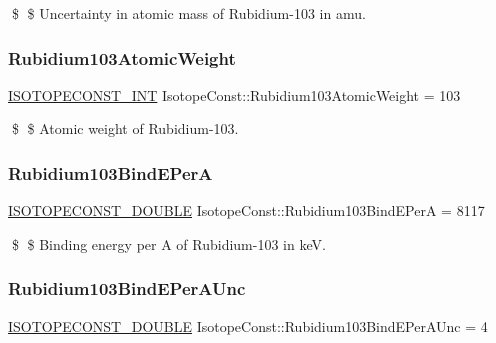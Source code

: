 \$ \$ Uncertainty in atomic mass of Rubidium-\/103 in amu. \mbox{\label{group___isotope_const-_rubidium-_rb103_ga675e2b14381f8e7da79d22f6431dfa25}} 
\subsubsection{\texorpdfstring{Rubidium103\+Atomic\+Weight}{Rubidium103AtomicWeight}}
{\footnotesize\ttfamily \mbox{\hyperlink{group___isotope_const-_macros_ga5f18360b3e99483a35c32d789e62621c}{I\+S\+O\+T\+O\+P\+E\+C\+O\+N\+S\+T\+\_\+\+I\+NT}} Isotope\+Const\+::\+Rubidium103\+Atomic\+Weight = 103}

\$ \$ Atomic weight of Rubidium-\/103. \mbox{\label{group___isotope_const-_rubidium-_rb103_ga9eebf343247ae664f3013ea9709173ca}} 
\subsubsection{\texorpdfstring{Rubidium103\+Bind\+E\+PerA}{Rubidium103BindEPerA}}
{\footnotesize\ttfamily \mbox{\hyperlink{group___isotope_const-_macros_ga8f45a7272ce02c0b4c65c44636ed719a}{I\+S\+O\+T\+O\+P\+E\+C\+O\+N\+S\+T\+\_\+\+D\+O\+U\+B\+LE}} Isotope\+Const\+::\+Rubidium103\+Bind\+E\+PerA = 8117}

\$ \$ Binding energy per A of Rubidium-\/103 in keV. \mbox{\label{group___isotope_const-_rubidium-_rb103_ga44164f2094fa73f354d8d70772d3bba1}} 
\subsubsection{\texorpdfstring{Rubidium103\+Bind\+E\+Per\+A\+Unc}{Rubidium103BindEPerAUnc}}
{\footnotesize\ttfamily \mbox{\hyperlink{group___isotope_const-_macros_ga8f45a7272ce02c0b4c65c44636ed719a}{I\+S\+O\+T\+O\+P\+E\+C\+O\+N\+S\+T\+\_\+\+D\+O\+U\+B\+LE}} Isotope\+Const\+::\+Rubidium103\+Bind\+E\+Per\+A\+Unc = 4}

